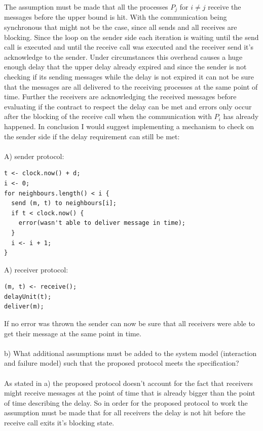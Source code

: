 \documentclass{article}
\begin{document}
The assumption must be made that all the processes $P_j$ for $i \neq j$ receive the messages before the
upper bound is hit. With the communication being synchronous that might not be the case, since all sends
and all receives are blocking. Since the loop on the sender side each iteration is waiting until the send 
call is executed and until the receive call was executed and the receiver send it's acknowledge to the 
sender. Under circumstances this overhead causes a huge enough delay that the upper delay already expired 
and since the sender is not checking if its sending messages while the delay is not expired it can not be 
sure that the messages are all delivered to the receiving processes at the same point of time. Further 
the receivers are acknowledging the received messages before evaluating if the contract to respect the 
delay can be met and errors only occur after the blocking of the receive call when the communication with 
$P_i$ has already happened. In conclusion I would suggest implementing a mechanism to check on the sender
side if the delay requirement can still be met:\\
\\
A) sender protocol:
\begin{lstlisting}[style=CStyle]
t <- clock.now() + d;
i <- 0;
for neighbours.length() < i {
  send (m, t) to neighbours[i];
  if t < clock.now() {
    error(wasn't able to deliver message in time);
  }
  i <- i + 1;
}
\end{lstlisting}
A) receiver protocol:
\begin{lstlisting}[style=CStyle]
(m, t) <- receive();
delayUnit(t);
deliver(m);
\end{lstlisting}
If no error was thrown the sender can now be sure that all receivers were able to get their message at
the same point in time.\\
\\
b) What additional assumptions must be added to the system model (interaction and failure model) such
that the proposed protocol meets the specification?\\
\\
As stated in a) the proposed protocol doesn't account for the fact that receivers might receive messages
at the point of time that is already bigger than the point of time describing the delay. So in order for
the proposed protocol to work the assumption must be made that for all receivers the delay is not hit
before the receive call exits it's blocking state.\\
\\
\end{document}
